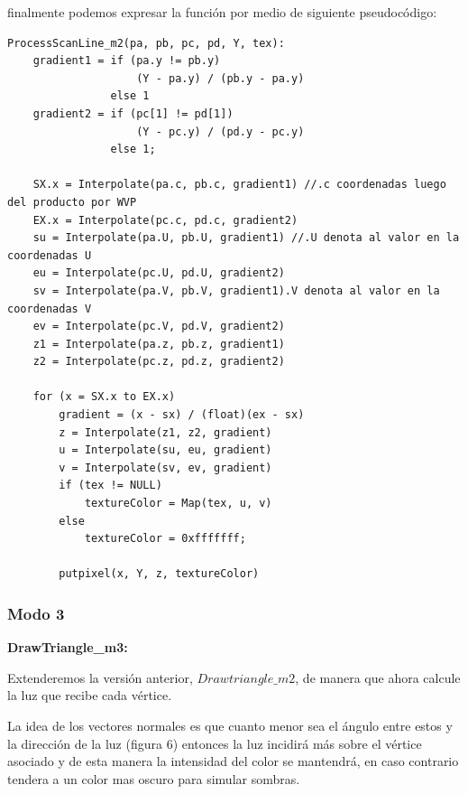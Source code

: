 \documentclass[a4paper]{article}
\newcounter{col}
\begin{document}
\par finalmente podemos expresar la función por medio de siguiente pseudocódigo: 
\begin{verbatim}
ProcessScanLine_m2(pa, pb, pc, pd, Y, tex):
    gradient1 = if (pa.y != pb.y) 
                    (Y - pa.y) / (pb.y - pa.y)
                else 1                          
    gradient2 = if (pc[1] != pd[1]) 
                    (Y - pc.y) / (pd.y - pc.y)
                else 1;
            
    SX.x = Interpolate(pa.c, pb.c, gradient1) //.c coordenadas luego del producto por WVP
    EX.x = Interpolate(pc.c, pd.c, gradient2)
    su = Interpolate(pa.U, pb.U, gradient1) //.U denota al valor en la coordenadas U
    eu = Interpolate(pc.U, pd.U, gradient2)
    sv = Interpolate(pa.V, pb.V, gradient1).V denota al valor en la coordenadas V
    ev = Interpolate(pc.V, pd.V, gradient2)
    z1 = Interpolate(pa.z, pb.z, gradient1)
    z2 = Interpolate(pc.z, pd.z, gradient2)
   
    for (x = SX.x to EX.x)
        gradient = (x - sx) / (float)(ex - sx)
        z = Interpolate(z1, z2, gradient)
        u = Interpolate(su, eu, gradient)
        v = Interpolate(sv, ev, gradient)
        if (tex != NULL)
            textureColor = Map(tex, u, v)
        else
            textureColor = 0xfffffff;
    
        putpixel(x, Y, z, textureColor)
\end{verbatim}
\subsubsection{Modo 3} 


\textbf{DrawTriangle\_m3:} 


        Extenderemos la versión anterior, $Drawtriangle\_m2$, de manera que ahora calcule la luz que recibe cada vértice.
\par La idea de los vectores normales es que cuanto menor sea el ángulo entre estos y la dirección de la luz (figura 6) entonces la luz incidirá más sobre el vértice asociado y de esta manera la intensidad del color se mantendrá, en caso contrario tendera a un color mas oscuro para simular sombras. 
        
\end{document}

